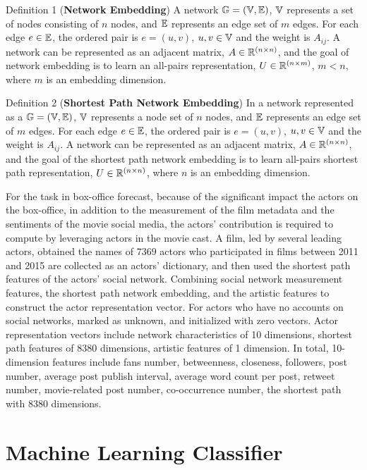 \documentclass[review]{cvpr}
\begin{document}
\par \noindent Definition 1 (\textbf{Network Embedding})  A network $\Bbb G=(\Bbb V,\Bbb E)$, $\Bbb V$ represents a set of nodes consisting of $n$ nodes, and $\Bbb E$ represents an edge set of $m$ edges.
For each edge $e\in \Bbb E$, the ordered pair is $e=(u,v)$, $u,v \in \Bbb V$ and the weight is $A_{ij}$.
A network can be represented as an adjacent matrix, $A\in \Bbb R^{(n\times n)}$, and the goal of network embedding is to learn an all-pairs representation, $U\in \Bbb R^{(n\times m)}$, $m < n$, where $m$ is an embedding dimension.

\par \noindent Definition 2 (\textbf{Shortest Path Network Embedding})  In a network represented as a $\Bbb G=(\Bbb V,\Bbb E)$, $\Bbb V$ represents a node set of $n$ nodes, and $\Bbb E$ represents an edge set of $m$ edges.
For each edge $e\in \Bbb E$, the ordered pair is $e=(u,v)$, $u,v \in \Bbb V$ and the weight is $A_{ij}$.
A network can be represented as an adjacent matrix, $A\in \Bbb R^{(n\times n)}$, and the goal of the shortest path network embedding is to learn all-pairs shortest path representation, $U\in \Bbb R^{(n\times n)}$, where $n$ is an embedding dimension.

\par For the task in box-office forecast, because of the significant impact the actors on the box-office, in addition to the measurement of the film metadata and the sentiments of the movie social media,
the actors' contribution is required to compute by leveraging actors in the movie cast.
A film, led by several leading actors, obtained the names of $7369$ actors who participated in films between 2011 and 2015 are collected as an actors' dictionary, and then used the shortest path features of the actors' social network.
Combining social network measurement features, the shortest path network embedding, and the artistic features to construct the actor representation vector.
For actors who have no accounts on social networks, marked as unknown, and initialized with zero vectors.
Actor representation vectors include network characteristics of 10 dimensions, shortest path features of 8380 dimensions, artistic features of 1 dimension.
In total, 10-dimension features include fans number, betweenness, closeness, followers, post number, average post publish interval, average word count per post, retweet number, movie-related post number, co-occurrence number, the shortest path with 8380 dimensions.

\section{Machine Learning Classifier}
\end{document}
